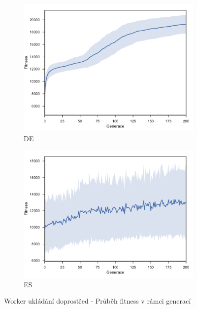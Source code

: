 	\begin{figure}[p]
		\centering
		\begin{subfigure}{.5\textwidth}
			\centering
			\includegraphics[width=\linewidth]{../img/WoodMap/DE/WorkerStockMem}
			\caption{DE}
			\label{obr04:StockDE}
		\end{subfigure}%
		\begin{subfigure}{.5\textwidth}
			\centering
			\includegraphics[width=\linewidth]{../img/WoodMap/ES/WoodStockES}
			\caption{ES}
			\label{obr04:StockES}
		\end{subfigure}
		\caption{Worker ukládání doprostřed  - Průběh fitness v rámci generací}
		\label{obr04:Stock}
	\end{figure}
	\clearpage
